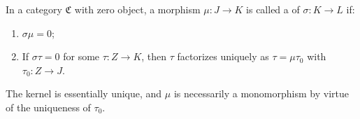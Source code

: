 In a category $\mathfrak{C}$ with zero object, a morphism $\mu: J \to K$ is called a  of $\sigma: K \to L$ if:
\begin{enumerate}
\item[(i)] $\sigma \mu = 0$;
\item[(ii)] If $\sigma \tau = 0$ for some $\tau: Z \to K$, then $\tau$ factorizes uniquely as $\tau = \mu \tau_0$ with $\tau_0: Z \to J$.
\end{enumerate}
The kernel is essentially unique, and $\mu$ is necessarily a monomorphism by virtue of the uniqueness of $\tau_0$.

